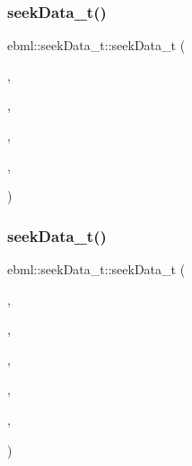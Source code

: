 \subsubsection{\texorpdfstring{seek\+Data\+\_\+t()}{seekData\_t()}\hspace{0.1cm}{\footnotesize\ttfamily [4/7]}}
{\footnotesize\ttfamily ebml\+::seek\+Data\+\_\+t\+::seek\+Data\+\_\+t (\begin{DoxyParamCaption}\item[{\mbox{\hyperlink{namespaceebml_a86c5f604ddf12a74aa9812e997a58691}{ebml\+I\+D\+\_\+t}}}]{,  }\item[{off\+\_\+t}]{,  }\item[{\mbox{\hyperlink{namespaceebml_a2ccdfb60b23efb51fe07f9d066e23604}{vint\+Width\+\_\+t}}}]{,  }\item[{size\+\_\+t}]{,  }\item[{const \mbox{\hyperlink{namespaceebml_adad533b7705a16bb360fe56380c5e7be}{ebml\+Element\+\_\+sp}} \&}]{ }\end{DoxyParamCaption})}

\mbox{\label{classebml_1_1seekData__t_a4073e066b0e82681eb486e249a5a3ed2}} 
\subsubsection{\texorpdfstring{seek\+Data\+\_\+t()}{seekData\_t()}\hspace{0.1cm}{\footnotesize\ttfamily [5/7]}}
{\footnotesize\ttfamily ebml\+::seek\+Data\+\_\+t\+::seek\+Data\+\_\+t (\begin{DoxyParamCaption}\item[{\mbox{\hyperlink{namespaceebml_a86c5f604ddf12a74aa9812e997a58691}{ebml\+I\+D\+\_\+t}}}]{,  }\item[{off\+\_\+t}]{,  }\item[{\mbox{\hyperlink{namespaceebml_a2ccdfb60b23efb51fe07f9d066e23604}{vint\+Width\+\_\+t}}}]{,  }\item[{size\+\_\+t}]{,  }\item[{const \mbox{\hyperlink{namespaceebml_adad533b7705a16bb360fe56380c5e7be}{ebml\+Element\+\_\+sp}} \&}]{,  }\item[{const \mbox{\hyperlink{namespaceebml_adad533b7705a16bb360fe56380c5e7be}{ebml\+Element\+\_\+sp}} \&}]{ }\end{DoxyParamCaption})}

